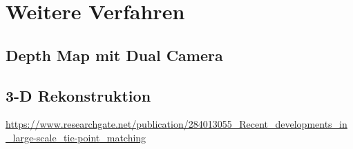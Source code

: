 \chapter{Weitere Verfahren}

\section{Depth Map mit Dual Camera}

\section{3-D Rekonstruktion}

\url{https://www.researchgate.net/publication/284013055_Recent_developments_in_large-scale_tie-point_matching}
